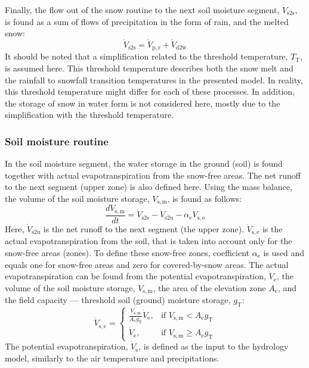 \documentclass[%
]{USN-PhD}
\begin{document}
Finally, the flow out of the snow routine to the next soil moisture segment, $\dot{V}_\mathrm{s2s}$, is found as a sum of flows of precipitation in the form of rain, and the melted snow:
\begin{equation}\label{eq:eq24}
\dot{V}_\mathrm{s2s}=\dot{V}_\mathrm{p,r}+\dot{V}_\mathrm{d2w}
\end{equation}
It should be noted that a simplification related to the threshold temperature, $T_\mathrm{T}$, is assumed here. This threshold temperature describes both the snow melt and the rainfall to snowfall transition temperatures in the presented model. In reality, this threshold temperature might differ for each of these processes. In addition, the storage of snow in water form is not considered here, mostly due to the simplification with the threshold temperature.

\subsubsection{Soil moisture routine}

In the soil moisture segment, the water storage in the ground (soil) is found together with actual evapotranspiration from the snow-free areas. The net runoff to the next segment (upper zone) is also defined here. Using the mass balance, the volume of the soil moisture storage, $V_\mathrm{s,m}$, is found as follows:
\begin{equation}\label{eq:eq25}
\frac{dV_\mathrm{s,m}}{dt}=\dot{V}_\mathrm{s2s}-\dot{V}_\mathrm{s2u}-\alpha_\mathrm{e}\dot{V}_\mathrm{s,e}
\end{equation}
Here, $\dot{V}_\mathrm{s2u}$ is the net runoff to the next segment (the upper zone). $\dot{V}_\mathrm{s,e}$ is the actual evapotranspiration from the soil, that is taken into account only for the snow-free areas (zones). To define these snow-free zones, coefficient $\alpha_\mathrm{e}$ is used and equals one for snow-free areas and zero for covered-by-snow areas. The actual evapotranspiration can be found from the potential evapotranspiration, $\dot{V}_\mathrm{e}$, the volume of the soil moisture storage, $V_\mathrm{s,m}$, the area of the elevation zone $A_\mathrm{e}$, and the field capacity --- threshold soil (ground) moisture storage, $g_\mathrm{T}$:
\begin{equation}\label{eq:eq26}
\dot{V}_\mathrm{s,e}=\begin{cases} \frac{V_\mathrm{s,m}}{A_\mathrm{e}g_\mathrm{T}}\dot{V}_\mathrm{e}, & \mbox{if } V_\mathrm{s,m}< A_\mathrm{e}g_\mathrm{T}\\ \dot{V}_\mathrm{e}, & \mbox{if } V_\mathrm{s,m}\geq A_\mathrm{e}g_\mathrm{T} \end{cases}
\end{equation}
The potential evapotranspiration, $\dot{V}_\mathrm{e}$, is defined as the input to the hydrology model, similarly to the air temperature and precipitations.
\end{document}
